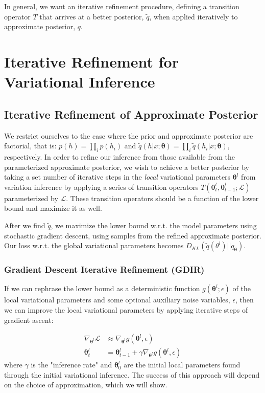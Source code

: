 \documentclass{article} %
\newcommand{\vects}[1]{\boldsymbol{#1}}
\newcommand{\TT}[0]{\vects{\theta}}
\newcommand{\grad}[0]{\nabla}
\newcommand{\LL}[0]{\mathcal{L}}
\begin{document}
In general, we want an iterative refinement procedure, defining a transition
operator $T$ that arrives at a better posterior, $\tilde{q}$, when applied
iteratively to approximate posterior, $q$. 

\section{Iterative Refinement for Variational Inference}

\subsection{Iterative Refinement of Approximate Posterior}
We restrict ourselves to the case where the prior and approximate posterior are
factorial, that is: $p(h) = \prod_i p(h_i)$ and $\tilde{q}(h|x; \TT) = \prod_i
\tilde{q}(h_i|x; \TT)$, respectively. In
order to refine our inference from those available from the parameterized
approximate posterior, we wish to achieve a better posterior by taking a set
number of iterative steps in the \emph{local} variational parameters $\TT^l$
from variation inference by applying a series of transition operators
$T(\TT^l_t, \TT^l_{t-1}; \LL)$ parameterized by $\LL$. These transition
operators should be a function of the lower bound and maximize it as well.

After we find $\tilde{q}$, we maximize the lower bound w.r.t. the model parameters using stochastic gradient descent, using samples from the refined approximate posterior. Our loss w.r.t. the global variational parameters becomes $D_{KL}(\tilde{q}(\theta^l)||q_{\TT})$.

\subsubsection{Gradient Descent Iterative Refinement (GDIR)}
If we can rephrase the lower bound as a deterministic function $g(\TT^l; \epsilon)$ of the local
variational parameters and some optional auxiliary noise variables, $\epsilon$,
then we can improve the local variational parameters by applying iterative steps
of gradient ascent:

\begin{align}
\grad_{\TT^l} \LL &\approx \grad_{\TT^l} g(\TT^l, \epsilon) \nonumber \\
\TT^l_t &= \TT^l_{t-1} + \gamma \grad_{\TT^l} g(\TT^l, \epsilon)
\end{align}
where $\gamma$ is the "inference rate" and $\TT^l_0$ are the initial local
parameters found through the initial variational inference. The success of this
approach will depend on the choice of approximation, which we will show.
\end{document}
